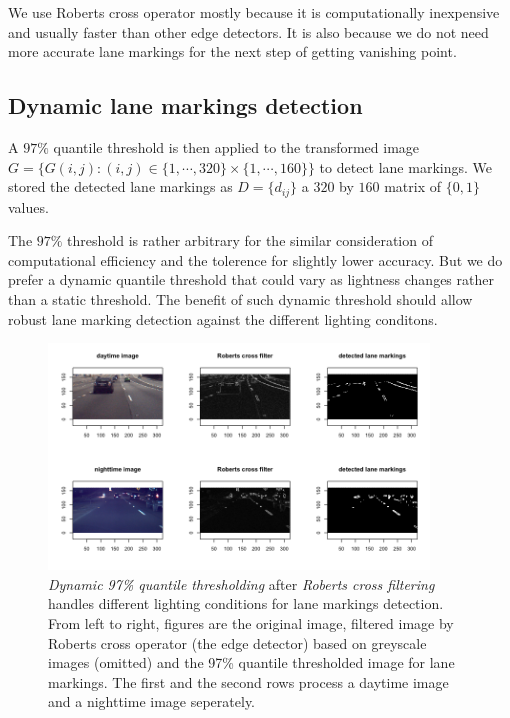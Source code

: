 \documentclass[11pt, oneside]{article}
\begin{document}
We use Roberts cross operator mostly because it is computationally inexpensive and usually faster than other edge detectors. It is also because we do not need more accurate lane markings for the next step of getting vanishing point. 

\subsection*{Dynamic lane markings detection}

A $97\%$ quantile threshold is then applied to the transformed image 
$G= \{G(i, j): (i, j) \in \{1, \cdots, 320\} \times \{1, \cdots, 160\} \}$ to detect lane markings. We stored the detected lane markings as $D = \{d_{ij}\}$ a $320$ by $160$ matrix of $\{0, 1\}$ values. 

The $97\%$ threshold is rather arbitrary for the similar consideration of computational efficiency and the tolerence for slightly lower accuracy. But we do prefer a dynamic quantile threshold that could vary as lightness changes rather than a static threshold. The benefit of such dynamic threshold should allow robust lane marking detection against the different lighting conditons. 

\begin{figure}[!ht] 
  \centering
      \includegraphics[width=0.9\textwidth]{Rplot1.png} 
  \caption{ \textit{Dynamic 97\% quantile thresholding} after \textit{Roberts cross filtering} handles different lighting conditions for lane markings detection. From left to right, figures are the original image, filtered image by Roberts cross operator (the edge detector) based on greyscale images (omitted) and the 97\% quantile thresholded image for lane markings. The first and the second rows process a daytime image and a nighttime image seperately. }
  \label{fig:Figure 1}
\end{figure}
\end{document}
